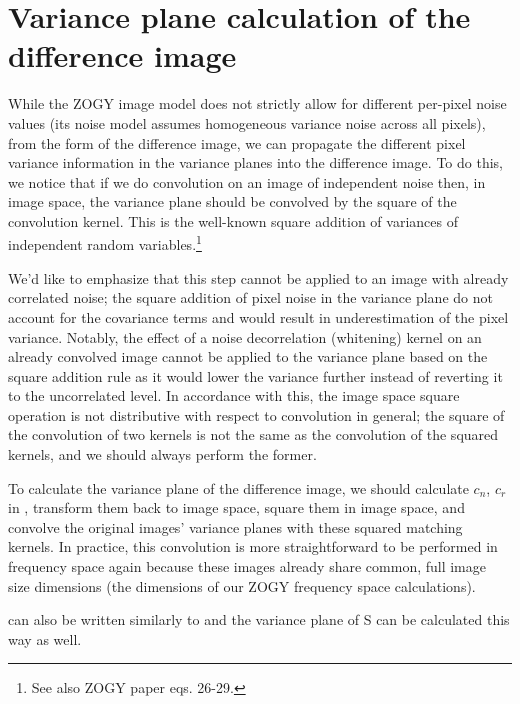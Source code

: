 \documentclass[11pt]{article}
\begin{document}
\section{Variance plane calculation of the difference image\label{sec:varplane}}
\par While the ZOGY image model does not strictly allow for different
per-pixel noise values (its noise model assumes homogeneous variance
noise across all pixels), from the  form of the
difference image, we can propagate the different pixel variance
information in the variance planes into the difference image. To do
this, we notice that if we do convolution on an image of independent
noise then, in image space, the variance plane should be convolved by
the square of the convolution kernel. This is the well-known square
addition of variances of independent random variables.\footnote{See
  also ZOGY paper eqs. 26-29.}
%
\par We'd like to emphasize that this step cannot be applied to an
image with already correlated noise; the square addition of pixel
noise in the variance plane do not account for the covariance terms
and would result in underestimation of the pixel
variance. Notably, the effect of a noise decorrelation
(whitening) kernel on an already convolved image cannot be applied to
the variance plane based on the square addition rule as it would lower
the variance further instead of reverting it to the uncorrelated
level. In accordance with this, the image space square operation is
not distributive with respect to convolution in general; the square of the
convolution of two kernels is not the same as the convolution of the
squared kernels, and we should always perform the former.
%
\par To calculate the variance plane of the difference image, we
should calculate \(c_n\), \(c_r\) in , transform them
back to image space, square them in image space, and convolve the
original images' variance planes with these squared matching
kernels. In practice, this convolution is more straightforward to be
performed in frequency space again because these images already share
common, full image size dimensions (the dimensions of our ZOGY
frequency space calculations).
%
\par {} can also be written similarly to  and
the variance plane of S can be calculated this way as well.
%
\end{document}
